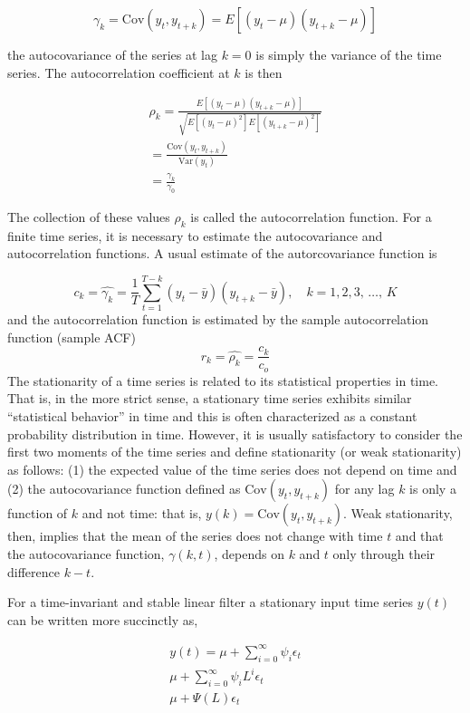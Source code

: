 \documentclass[
  11pt,
]{article}
\begin{document}
\[
\gamma_{k} = \mathrm{Cov}(y_{t}, y_{t+k}) = E\left[(y_{t} - \mu)(y_{t+k} - \mu)\right]
\]

the autocovariance of the series at lag \(k = 0\) is simply the variance
of the time series. The autocorrelation coefficient at \(k\) is then

\begin{gather*}
\rho_{k} = \frac{E[(y_{t} - \mu)(y_{t+k} -\mu)]}{\sqrt{E[(y_{t} - \mu)^{2}]E[(y_{t+k} - \mu)^{2}]}} \\[8pt]
= \frac{\mathrm{Cov}(y_{t}, y_{t+k})}{\mathrm{Var}(y_{t})}\\[8pt]
= \frac{\gamma_{k}}{\gamma_{0}}
\end{gather*}

The collection of these values \(\rho_{k}\) is called the
autocorrelation function. For a finite time series, it is necessary to
estimate the autocovariance and autocorrelation functions. A usual
estimate of the autorcovariance function is

\[
c_{k} = \hat{\gamma_{k}} = \frac{1}{T} \sum\limits_{t = 1}^{T-k}(y_{t} -\bar{y})(y_{t+k} - \bar{y}), \quad k = 1, 2, 3,\, \ldots,\, K
\] and the autocorrelation function is estimated by the sample
autocorrelation function (sample ACF) \[
r_{k} = \hat{\rho_{k}} = \frac{c_{k}}{c_{o}}
\] The stationarity of a time series is related to its statistical
properties in time. That is, in the more strict sense, a stationary time
series exhibits similar ``statistical behavior'' in time and this is
often characterized as a constant probability distribution in time.
However, it is usually satisfactory to consider the first two moments of
the time series and define stationarity (or weak stationarity) as
follows: (1) the expected value of the time series does not depend on
time and (2) the autocovariance function defined as
\(\mathrm{Cov}(y_{t}, y_{t+k})\) for any lag \(k\) is only a function of
\(k\) and not time: that is, \(y(k) = \mathrm{Cov}(y_{t}, y_{t+k})\).
Weak stationarity, then, implies that the mean of the series does not
change with time \(t\) and that the autocovariance function,
\(\gamma(k, t)\), depends on \(k\) and \(t\) only through their
difference \(k - t\).

For a time-invariant and stable linear filter a stationary input time
series \(y(t)\) can be written more succinctly as,

\begin{gather*}
y(t) = \mu + \sum\limits_{i= 0}^{\infty}\psi_{i}\epsilon_{t} \\[8pt]
\mu + \sum\limits_{i=0}^{\infty}\psi_{i}L^{i}\epsilon_{t} \\[8pt]
\mu + \Psi(L)\epsilon_{t}
\end{gather*}
\end{document}
